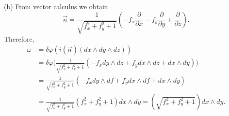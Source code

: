 \begin{enumerate}
(b) From vector calculus we obtain
\[\vec{n}=\frac{1}{\sqrt{f_{x}^{2}+f_{y}^{2}+1}}\left(-f_{x} \frac{\partial}{\partial x}-f_{y} \frac{\partial}{\partial y}+\frac{\partial}{\partial z}\right).\]
Therefore,
\begin{align*}
\omega & =\delta \varphi(i(\vec{n})(d x \wedge d y \wedge d z)) \\
& =\delta \varphi\Bigg(\frac{1}{\sqrt{f_{x}^{2}+f_{y}^{2}+1}}\left(-f_{x} d y \wedge d z+f_{y} d x \wedge d z+d x \wedge d y\right)\Bigg) \\
& =\frac{1}{\sqrt{f_{x}^{2}+f_{y}^{2}+1}}\left(-f_{x} d y \wedge d f+f_{y} d x \wedge d f+d x \wedge d y\right) \\
& =\frac{1}{\sqrt{f_{x}^{2}+f_{y}^{2}+1}}\left(f_{x}^{2}+f_{y}^{2}+1\right) d x \wedge d y
=\left(\sqrt{f_{x}^{2}+f_{y}^{2}+1}\right) d x \wedge d y.
\end{align*}
\end{enumerate}